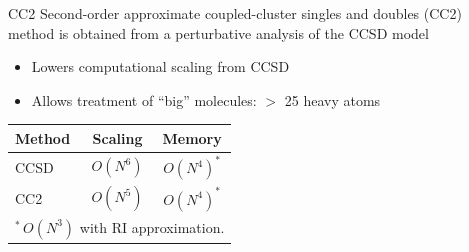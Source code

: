\documentclass[9pt,t,xcolor=table]{beamer}
\begin{document}
\begin{frame}{\huge CC2}\large
	Second-order approximate coupled-cluster singles and doubles (CC2) method is obtained from a perturbative analysis of the CCSD model
	\vspace{5pt}
	\begin{itemize}
		\item Lowers computational scaling from CCSD 
		\item Allows treatment of “big” molecules: $>$ 25 heavy atoms
	\end{itemize}
	\centering
	\vspace{30pt}
	\begin{table}
		\centering
		\begin{tabular}{lcc}\toprule
		\textbf{Method} & \textbf{Scaling} & \textbf{Memory}\\\midrule
		CCSD & $O(N^6)$ & $O(N^{4})^*$\\
		CC2 & $O(N^5)$ & $O(N^{4})^*$\\\bottomrule
		\multicolumn{3}{l}{\small $^*\,O(N^3)$ with RI approximation.}
		\end{tabular}
	\end{table}
\end{frame}
\fi
\end{document}
